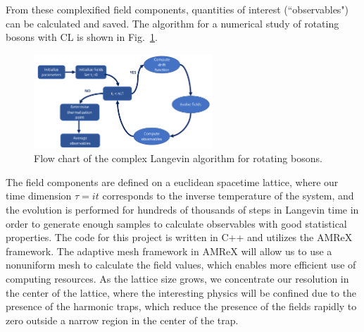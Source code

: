 \documentclass[onecolumn, 12pt]{article}
\newcommand{\casey}[1]{{\color{green} \bf[CB: #1]}}
\begin{document}
%
%

From these complexified field components, quantities of interest (``observables") can be calculated and saved. The algorithm for a numerical study of rotating bosons with CL is shown in Fig.~\ref{Fig:Algorithm}.
%
\begin{figure}[h]
\centering
\includegraphics[width=0.6\textwidth]{./algorithm.pdf}
\caption{\label{Fig:Algorithm} Flow chart of the complex Langevin algorithm for rotating bosons.\vspace{-3mm}}
\end{figure}
%
The field components are defined on a euclidean spacetime lattice, where our time dimension $\tau = i t$ corresponds to the inverse temperature of the system, and the evolution is performed for hundreds of thousands of steps in Langevin time in order to generate enough samples to calculate observables with good statistical properties. The code for this project is written in C++ and utilizes the AMReX framework. The adaptive mesh framework in AMReX will allow us to use a nonuniform mesh to calculate the field values, which enables more efficient use of computing resources. As the lattice size grows, we concentrate our resolution in the center of the lattice, where the interesting physics will be confined due to the presence of the harmonic traps, which reduce the presence of the fields rapidly to zero outside a narrow region in the center of the trap.
\end{document}

